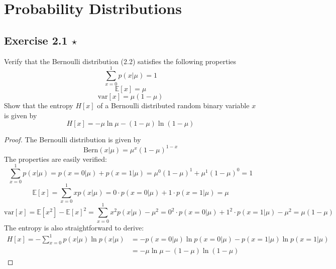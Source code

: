 \chapter{Probability Distributions}

\section*{Exercise 2.1 $\star$}
Verify that the Bernoulli distribution (2.2) satisfies
the following properties
\begin{equation*}
    \sum_{x=0}^{1} p(x | \mu) = 1
    \tag{2.257}\label{eq:2.257}
\end{equation*}
\vspace{-1em}
\begin{equation*}
    \mathbb{E}[x] = \mu
    \tag{2.258}\label{eq:2.258}
\end{equation*}
\vspace{-1em}
\begin{equation*}
    \text{var}[x] = \mu(1 - \mu)
    \tag{2.259}\label{eq:2.259}
\end{equation*}
Show that the entropy $H[x]$ of a Bernoulli distributed
random binary variable $x$ is given by
\begin{equation*}
    H[x] = -\mu \ln \mu - (1 - \mu) \ln(1 - \mu)
    \tag{2.260}\label{eq:2.260}
\end{equation*}

\vspace{1em}

\begin{proof}
    The Bernoulli distribution is given by
    \begin{equation*}
        \text{Bern}(x | \mu) = \mu^x (1 - \mu)^{1-x}
        \tag{2.2}\label{eq:2.2}
    \end{equation*}
    The properties are easily verified:
    \[
        \sum_{x=0}^{1} p(x | \mu) = p(x = 0 | \mu) + p(x = 1 | \mu)
        = \mu^0(1 - \mu)^1 + \mu^1(1 - \mu)^0 = 1 \tag{2.257}
    \] 
    \[
        \mathbb{E}[x] = \sum_{x=0}^{1} xp(x | \mu)
        = 0 \cdot p(x = 0 | \mu) + 1 \cdot p(x = 1 | \mu)
        = \mu \tag{2.258}
    \] 
    \[
        \text{var}[x] = \mathbb{E}[x^2] - \mathbb{E}[x]^2
        = \sum_{x=0}^{1} x^2 p(x|\mu) - \mu^2
        = 0^2 \cdot p(x = 0 | \mu) + 1^2 \cdot p(x = 1 | \mu) - \mu^2
        = \mu(1 - \mu) \tag{2.259}
    \] 
    The entropy is also straightforward to derive: 
    \begin{align*}
        H[x] = -\sum_{x=0}^{1} p(x | \mu) \ln p(x | \mu)
        &= -p(x = 0 | \mu)\ln p(x = 0 | \mu) - p(x = 1 | \mu) \ln p(x = 1 | \mu) \\
        &= -\mu \ln \mu - (1 - \mu) \ln(1 - \mu)
    \end{align*}
\end{proof}

